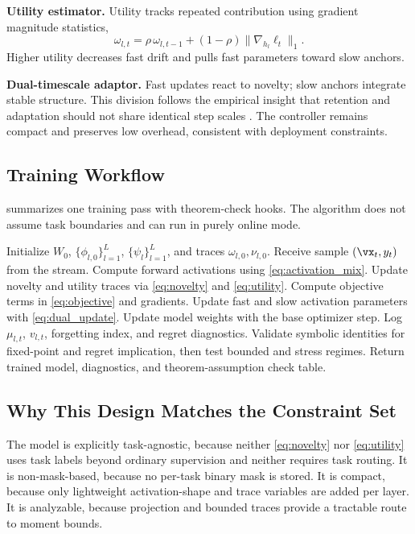 \documentclass{article} %
\begin{document}
\textbf{Utility estimator.}
Utility tracks repeated contribution using gradient magnitude statistics,
\begin{equation}
\omega_{l,t}=\rho\,\omega_{l,t-1}+(1-\rho)\|\nabla_{h_l}\ell_t\|_1.
\label{eq:utility}
\end{equation}
Higher utility decreases fast drift and pulls fast parameters toward slow anchors.

\textbf{Dual-timescale adaptor.}
Fast updates react to novelty; slow anchors integrate stable structure. This division follows the empirical insight that retention and adaptation should not share identical step scales \citep{s12,s38}. The controller remains compact and preserves low overhead, consistent with deployment constraints.

\subsection{Training Workflow}
 summarizes one training pass with theorem-check hooks. The algorithm does not assume task boundaries and can run in purely online mode.

\begin{algorithm}[t]
\caption{Dual-Timescale Activation Update with Theorem-Check Hooks}
\label{alg:dtac}
\begin{algorithmic}
\STATE Initialize $W_0$, $\{\phi_{l,0}\}_{l=1}^L$, $\{\psi_l\}_{l=1}^L$, and traces $\omega_{l,0},\nu_{l,0}$.
  \STATE Receive sample $(\vx_t,y_t)$ from the stream.
  \STATE Compute forward activations using \eqref{eq:activation_mix}.
  \STATE Update novelty and utility traces via \eqref{eq:novelty} and \eqref{eq:utility}.
  \STATE Compute objective terms in \eqref{eq:objective} and gradients.
  \STATE Update fast and slow activation parameters with \eqref{eq:dual_update}.
  \STATE Update model weights with the base optimizer step.
  \STATE Log $\mu_{l,t}$, $v_{l,t}$, forgetting index, and regret diagnostics.
\ENDFOR
\STATE Validate symbolic identities for fixed-point and regret implication, then test bounded and stress regimes.
\STATE Return trained model, diagnostics, and theorem-assumption check table.
\end{algorithmic}
\end{algorithm}

\subsection{Why This Design Matches the Constraint Set}
The model is explicitly task-agnostic, because neither \eqref{eq:novelty} nor \eqref{eq:utility} uses task labels beyond ordinary supervision and neither requires task routing. It is non-mask-based, because no per-task binary mask is stored. It is compact, because only lightweight activation-shape and trace variables are added per layer. It is analyzable, because projection and bounded traces provide a tractable route to moment bounds.
\end{document}
